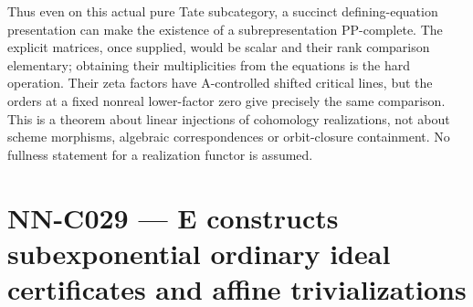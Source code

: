 Thus even on this actual pure Tate subcategory, a succinct defining-equation presentation can make the existence of a subrepresentation PP-complete. The explicit matrices, once supplied, would be scalar and their rank comparison elementary; obtaining their multiplicities from the equations is the hard operation. Their zeta factors have A-controlled shifted critical lines, but the orders at a fixed nonreal lower-factor zero give precisely the same comparison. This is a theorem about linear injections of cohomology realizations, not about scheme morphisms, algebraic correspondences or orbit-closure containment. No fullness statement for a realization functor is assumed.



\section{NN-C029 --- E constructs subexponential ordinary ideal certificates and affine trivializations}
